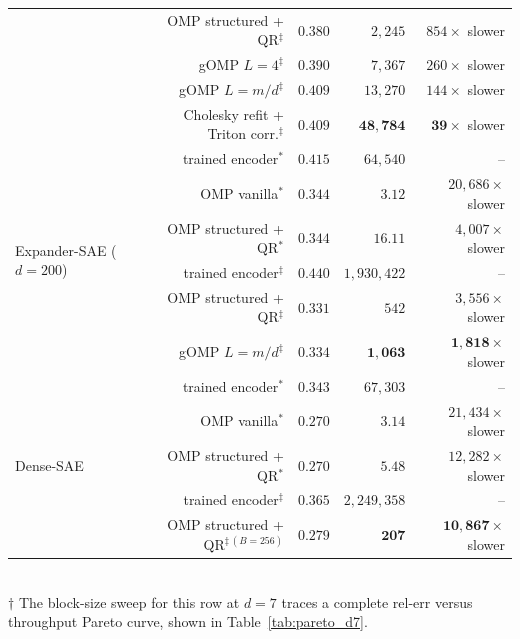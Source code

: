 \documentclass{article}
\theoremstyle{plain}
\theoremstyle{definition}
\theoremstyle{remark}
\begin{document}
\begin{table}[!htbp]
\begin{tabular}{lrrrr}
                                                  & OMP structured + QR$^\ddagger$            & $0.380$ & $2{,}245$ & $854\times$ slower \\
                                                  & gOMP $L{=}4^\ddagger$                     & $0.390$ & $7{,}367$  & $260\times$ slower \\
                                                  & gOMP $L{=}m/d^\ddagger$                   & $0.409$ & $13{,}270$ & $144\times$ slower \\
                                                  & Cholesky refit + Triton corr.$^\ddagger$  & $0.409$ & $\mathbf{48{,}784}$ & $\mathbf{39\times}$ slower \\
        \midrule
        \multirow{6}{*}{Expander-SAE ($d{=}200$)} & trained encoder$^*$                       & $0.415$ & $64{,}540$    & --                       \\
                                                  & OMP vanilla$^*$                           & $0.344$ & $3.12$        & $20{,}686\times$ slower  \\
                                                  & OMP structured + QR$^*$                   & $0.344$ & $16.11$       & $4{,}007\times$ slower   \\
                                                  & trained encoder$^\ddagger$                & $0.440$ & $1{,}930{,}422$ & --                     \\
                                                  & OMP structured + QR$^\ddagger$            & $0.331$ & $542$ & $3{,}556\times$ slower \\
                                                  & gOMP $L{=}m/d^\ddagger$                   & $0.334$ & $\mathbf{1{,}063}$ & $\mathbf{1{,}818\times}$ slower \\
        \midrule
        \multirow{5}{*}{Dense-SAE}                & trained encoder$^*$                       & $0.343$ & $67{,}303$    & --                       \\
                                                  & OMP vanilla$^*$                           & $0.270$ & $3.14$        & $21{,}434\times$ slower  \\
                                                  & OMP structured + QR$^*$                   & $0.270$ & $5.48$        & $12{,}282\times$ slower  \\
                                                  & trained encoder$^\ddagger$                & $0.365$ & $2{,}249{,}358$ & --                     \\
                                                  & OMP structured + QR$^{\ddagger\,(B{=}256)}$ & $0.279$ & $\mathbf{207}$ & $\mathbf{10{,}867\times}$ slower \\
        \bottomrule
    \end{tabular}\\
    \footnotesize
    $\dagger$ The block-size sweep for this row at $d{=}7$ traces a complete rel-err versus throughput Pareto curve, shown in Table~\ref{tab:pareto_d7}.
\end{table}
\end{document}
